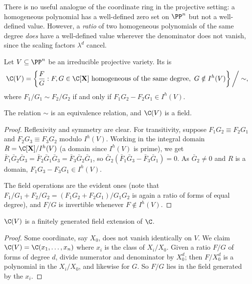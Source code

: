 There is no useful analogue of the coordinate ring in the projective setting: a homogeneous polynomial has a well-defined zero set on $\PP^n$ but not a well-defined value. However, a \emph{ratio} of two homogeneous polynomials of the same degree \emph{does} have a well-defined value wherever the denominator does not vanish, since the scaling factors $\lambda^d$ cancel.

\begin{definition}
	Let $V \subseteq \PP^n$ be an irreducible projective variety. Its  is
	$$\C(V) = \left\{ \frac{F}{G} : F,G \in \C[\mathbf X] \text{ homogeneous of the same degree},\ G \notin I^h(V)\right\}\bigg/ \sim,$$
	where $F_1/G_1 \sim F_2/G_2$ if and only if $F_1G_2 - F_2G_1 \in I^h(V)$.
\end{definition}

\begin{lemma}
	The relation $\sim$ is an equivalence relation, and $\C(V)$ is a field.
\end{lemma}

\begin{proof}
	Reflexivity and symmetry are clear. For transitivity, suppose $F_1G_2 \equiv F_2G_1$ and $F_2G_3 \equiv F_3G_2$ modulo $I^h(V)$. Working in the integral domain $R = \C[\mathbf X]/I^h(V)$ (a domain since $I^h(V)$ is prime), we get $\bar F_1 \bar G_2 \bar G_3 = \bar F_2\bar G_1\bar G_3 = \bar F_3 \bar G_2 \bar G_1$, so $\bar G_2(\bar F_1 \bar G_3 - \bar F_3\bar G_1) = 0$. As $\bar G_2 \neq 0$ and $R$ is a domain, $F_1G_3 - F_3G_1 \in I^h(V)$.

	The field operations are the evident ones (note that $F_1/G_1 + F_2/G_2 = (F_1G_2+F_2G_1)/G_1G_2$ is again a ratio of forms of equal degree), and $F/G$ is invertible whenever $F \notin I^h(V)$.
\end{proof}

\begin{proposition}
	$\C(V)$ is a finitely generated field extension of $\C$.
\end{proposition}

\begin{proof}
	Some coordinate, say $X_0$, does not vanish identically on $V$. We claim $\C(V) = \C(x_1,\dots,x_n)$ where $x_i$ is the class of $X_i/X_0$. Given a ratio $F/G$ of forms of degree $d$, divide numerator and denominator by $X_0^d$; then $F/X_0^d$ is a polynomial in the $X_i/X_0$, and likewise for $G$. So $F/G$ lies in the field generated by the $x_i$.
\end{proof}

